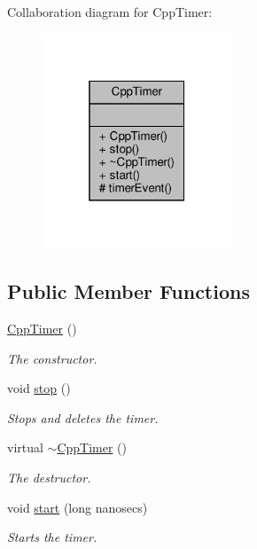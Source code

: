 Collaboration diagram for Cpp\+Timer\+:\nopagebreak
\begin{figure}[H]
\begin{center}
\leavevmode
\includegraphics[width=160pt]{classCppTimer__coll__graph}
\end{center}
\end{figure}
\subsection*{Public Member Functions}
\begin{DoxyCompactItemize}
\item 
\mbox{\label{classCppTimer_a327a07c051b9b60fcc61e6fd8f40f381}} 
\hyperlink{classCppTimer_a327a07c051b9b60fcc61e6fd8f40f381}{Cpp\+Timer} ()
\begin{DoxyCompactList}\small\item\em The constructor. \end{DoxyCompactList}\item 
\mbox{\label{classCppTimer_a4bb95ddee98a536d0818b8f6096bf7e7}} 
void \hyperlink{classCppTimer_a4bb95ddee98a536d0818b8f6096bf7e7}{stop} ()
\begin{DoxyCompactList}\small\item\em Stops and deletes the timer. \end{DoxyCompactList}\item 
\mbox{\label{classCppTimer_a2942aab831713273a76218048fe61b16}} 
virtual \hyperlink{classCppTimer_a2942aab831713273a76218048fe61b16}{$\sim$\+Cpp\+Timer} ()
\begin{DoxyCompactList}\small\item\em The destructor. \end{DoxyCompactList}\item 
\mbox{\label{classCppTimer_a8d284721892e8e2665433f17045143e8}} 
void \hyperlink{classCppTimer_a8d284721892e8e2665433f17045143e8}{start} (long nanosecs)
\begin{DoxyCompactList}\small\item\em Starts the timer. \end{DoxyCompactList}\end{DoxyCompactItemize}
